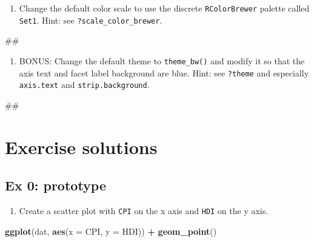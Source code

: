 \documentclass[]{book}
\newenvironment{Shaded}{\begin{snugshade}}{\end{snugshade}}
\newcommand{\KeywordTok}[1]{\textcolor[rgb]{0.13,0.29,0.53}{\textbf{#1}}}
\newcommand{\DataTypeTok}[1]{\textcolor[rgb]{0.13,0.29,0.53}{#1}}
\newcommand{\StringTok}[1]{\textcolor[rgb]{0.31,0.60,0.02}{#1}}
\newcommand{\OperatorTok}[1]{\textcolor[rgb]{0.81,0.36,0.00}{\textbf{#1}}}
\newcommand{\NormalTok}[1]{#1}
\providecommand{\tightlist}{%
  \setlength{\itemsep}{0pt}\setlength{\parskip}{0pt}}
\begin{document}
\begin{enumerate}
\def\labelenumi{\arabic{enumi}.}
\setcounter{enumi}{4}
\tightlist
\item
  Change the default color scale to use the discrete
  \texttt{RColorBrewer} palette called \texttt{Set1}. Hint: see
  \texttt{?scale\_color\_brewer}.
\end{enumerate}

\begin{Shaded}
\begin{Highlighting}[]
\NormalTok{## }
\end{Highlighting}
\end{Shaded}

\begin{enumerate}
\def\labelenumi{\arabic{enumi}.}
\setcounter{enumi}{5}
\tightlist
\item
  BONUS: Change the default theme to \texttt{theme\_bw()} and modify it
  so that the axis text and facet label background are blue. Hint: see
  \texttt{?theme} and especially \texttt{axis.text} and
  \texttt{strip.background}.
\end{enumerate}

\begin{Shaded}
\begin{Highlighting}[]
\NormalTok{## }
\end{Highlighting}
\end{Shaded}

\section{Exercise solutions}\label{exercise-solutions-2}

\subsection{Ex 0: prototype}\label{ex-0-prototype-2}

\begin{enumerate}
\def\labelenumi{\arabic{enumi}.}
\tightlist
\item
  Create a scatter plot with \texttt{CPI} on the x axis and \texttt{HDI}
  on the y axis.
\end{enumerate}

\begin{Shaded}
\begin{Highlighting}[]
\KeywordTok{ggplot}\NormalTok{(dat, }\KeywordTok{aes}\NormalTok{(}\DataTypeTok{x =}\NormalTok{ CPI, }\DataTypeTok{y =}\NormalTok{ HDI)) }\OperatorTok{+}
\StringTok{  }\KeywordTok{geom_point}\NormalTok{()}
\end{Highlighting}
\end{Shaded}
\end{document}
